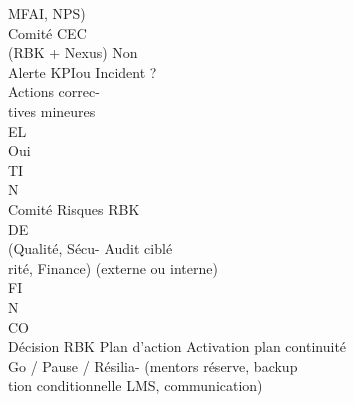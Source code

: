 \documentclass[12pt,landscape,a4paper]{article}
\begin{document}
MFAI, NPS)\\
\vspace{0.5em}
\vspace{0.5em}
\vspace{0.5em}
\vspace{0.5em}
Comité CEC\\
(RBK + Nexus)                           Non\\
Alerte KPIou Incident ?\\
Actions correc-\\
tives mineures\\
\vspace{0.5em}
\vspace{0.5em}
\vspace{0.5em}
\vspace{0.5em}
EL\\
Oui\\
\vspace{0.5em}
\vspace{0.5em}
\vspace{0.5em}
\vspace{0.5em}
TI\\
N\\
Comité Risques RBK\\
\vspace{0.5em}
\vspace{0.5em}
\vspace{0.5em}
\vspace{0.5em}
DE\\
(Qualité, Sécu-                                                    Audit ciblé\\
rité, Finance)                                                         (externe ou interne)\\
\vspace{0.5em}
\vspace{0.5em}
\vspace{0.5em}
\vspace{0.5em}
FI\\
N\\
CO\\
\vspace{0.5em}
Décision RBK                                              Plan d’action     Activation plan continuité\\
Go / Pause / Résilia-                                                    (mentors réserve, backup\\
tion conditionnelle                                                        LMS, communication)\\
\end{document}
